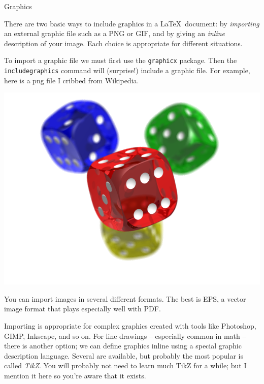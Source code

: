 \documentclass{article}
\begin{document}
\begin{center}
\Large Graphics
\end{center}

There are two basic ways to include graphics in a \LaTeX\ document: by \emph{importing} an external graphic file such as a PNG or GIF, and by giving an \emph{inline} description of your image. Each choice is appropriate for different situations.

To import a graphic file we must first use the \texttt{graphicx} package. Then the \texttt{includegraphics} command will (surprise!) include a graphic file. For example, here is a png file I cribbed from Wikipedia.

\begin{center}
\includegraphics[scale=0.3]{gfx/dice.png}
\end{center}

You can import images in several different formats. The best is EPS, a vector image format that plays especially well with PDF.

Importing is appropriate for complex graphics created with tools like Photoshop, GIMP, Inkscape, and so on. For line drawings -- especially common in math -- there is another option; we can define graphics inline using a special graphic description language. Several are available, but probably the most popular is called \emph{TikZ}. You will probably not need to learn much TikZ for a while; but I mention it here so you're aware that it exists.
\end{document}
